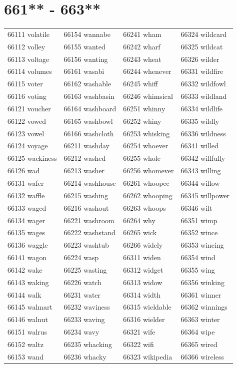 \documentclass[10pt, oneside]{book}
\begin{document}
\begin{table}
	\centering
	\section*{661** - 663**}
	\begin{tabular}{l l l l}
66111 volatile &66154 wannabe &66241 wham &66324 wildcard\\
66112 volley &66155 wanted &66242 wharf &66325 wildcat\\
66113 voltage &66156 wanting &66243 wheat &66326 wilder\\
66114 volumes &66161 wasabi &66244 whenever &66331 wildfire\\
66115 voter &66162 washable &66245 whiff &66332 wildfowl\\
66116 voting &66163 washbasin &66246 whimsical &66333 wildland\\
66121 voucher &66164 washboard &66251 whinny &66334 wildlife\\
66122 vowed &66165 washbowl &66252 whiny &66335 wildly\\
66123 vowel &66166 washcloth &66253 whisking &66336 wildness\\
66124 voyage &66211 washday &66254 whoever &66341 willed\\
66125 wackiness &66212 washed &66255 whole &66342 willfully\\
66126 wad &66213 washer &66256 whomever &66343 willing\\
66131 wafer &66214 washhouse &66261 whoopee &66344 willow\\
66132 waffle &66215 washing &66262 whooping &66345 willpower\\
66133 waged &66216 washout &66263 whoops &66346 wilt\\
66134 wager &66221 washroom &66264 why &66351 wimp\\
66135 wages &66222 washstand &66265 wick &66352 wince\\
66136 waggle &66223 washtub &66266 widely &66353 wincing\\
66141 wagon &66224 wasp &66311 widen &66354 wind\\
66142 wake &66225 wasting &66312 widget &66355 wing\\
66143 waking &66226 watch &66313 widow &66356 winking\\
66144 walk &66231 water &66314 width &66361 winner\\
66145 walmart &66232 waviness &66315 wieldable &66362 winnings\\
66146 walnut &66233 waving &66316 wielder &66363 winter\\
66151 walrus &66234 wavy &66321 wife &66364 wipe\\
66152 waltz &66235 whacking &66322 wifi &66365 wired\\
66153 wand &66236 whacky &66323 wikipedia &66366 wireless\\
	\end{tabular}
 \end{table}
\clearpage
\end{document}
